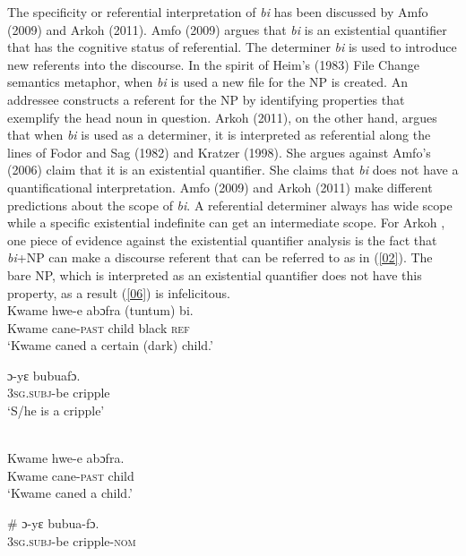 \documentclass[output=paper,modfonts]{langsci/langscibook}
\begin{document}
The specificity or referential interpretation of \emph{bi} has been discussed by Amfo (2009) and Arkoh (2011). Amfo (2009) argues that \emph{bi} is an existential quantifier that has the cognitive status of referential. The determiner \emph{bi} is used to introduce new referents into the discourse. In the spirit of Heim's (1983) File Change semantics metaphor, when \emph{bi} is used a new file for the NP is created. An addressee constructs a referent for the NP by identifying properties that exemplify the head noun in question. Arkoh (2011), on the other hand, argues that when \emph{bi} is used as a determiner, it is interpreted as referential along the lines of Fodor and Sag (1982) and Kratzer (1998). She argues against Amfo's (2006) claim that it is an existential quantifier. She claims that \emph{bi} does not have a quantificational interpretation. Amfo (2009) and Arkoh (2011) make different predictions about the scope of \emph{bi}. A referential determiner always has wide scope while a specific existential indefinite can get an intermediate scope. For Arkoh \cite{Arkoh2011}, one piece of evidence against the existential quantifier analysis is the fact that \emph{bi}+NP can make a discourse referent that can be referred to as in (\ref{02}). The bare NP, which is interpreted as an existential quantifier does not have this property, as a result (\ref{06}) is infelicitous.    
\ea
{}\\
\ea\label{01} 
\gll Kwame  hwe-e  abɔfra (tuntum) bi.\\
 Kwame cane-\textsc{past} child black \textsc{ref}\\
 
\glt ‘Kwame caned a certain (dark) child.'

\ex\label{02}
\gll ɔ-yε bubuafɔ.\\
3\textsc{sg.subj}-be cripple\\
 
\glt ‘S/he is a cripple’
\z \z

\ea
{}\\
\ea\label{05} 
\gll Kwame  hwe-e  abɔfra.\\
 Kwame cane-\textsc{past} child \\
 
\glt ‘Kwame caned a child.'

\ex\label{06}
\gll \# ɔ-yε bubua-fɔ.\\
{} 3\textsc{sg.subj}-be cripple-\textsc{nom}\\
 
\end{document}
